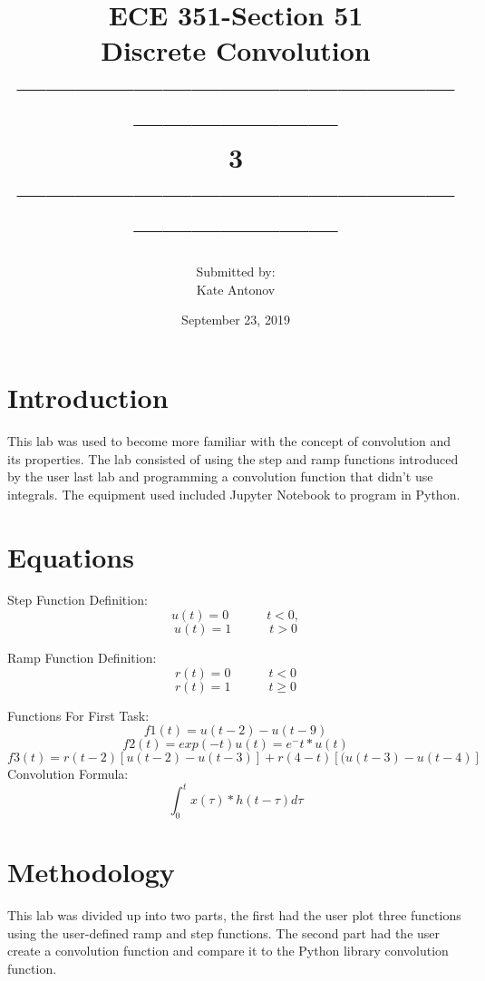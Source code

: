 \documentclass[12pt]{article}
\title{ECE 351-Section 51 \\ Discrete Convolution \\ ------------------------------------------------------------------\\ 3 \\------------------------------------------------------------------}
\author{Submitted by: \\  Kate Antonov}
\date{September 23, 2019}
\begin{document}
\vspace{\fill}

\maketitle

\vspace{\fill}
\thispagestyle{empty}
\clearpage

\clearpage
\thispagestyle{empty}
\tableofcontents
\clearpage

\section{Introduction}
This lab was used to become more familiar with the concept of convolution and its properties. The lab consisted of using the step and ramp functions introduced by the user last lab and programming a convolution function that didn't use integrals. The equipment used included Jupyter Notebook to program in Python.
\section{Equations}
Step Function Definition:
\[u(t) = 0  \hspace{3em} t < 0,\]
\[u(t) = 1  \hspace{3em} t > 0\]

Ramp Function Definition:
\[r(t) = 0 \hspace{3em} t < 0\]
\[r(t) = 1 \hspace{3em} t 	\geq 0\]

Functions For First Task:
\[f1(t) = u(t-2) - u(t-9)\]
\[f2(t) = exp(-t)u(t) = e^-t*u(t)\]
\[f3(t) = r(t-2)[u(t-2) - u(t-3)] + r(4-t)[(u(t-3) - u(t-4)]\]
Convolution Formula:
\[\int_{0}^{t} x(\tau)*h(t-\tau) d\tau\]

\section{ Methodology}
This lab was divided up into two parts, the first had the user plot three functions using the user-defined ramp and step functions. The second part had the user create a convolution function and compare it to the Python library convolution function.
\end{document}
